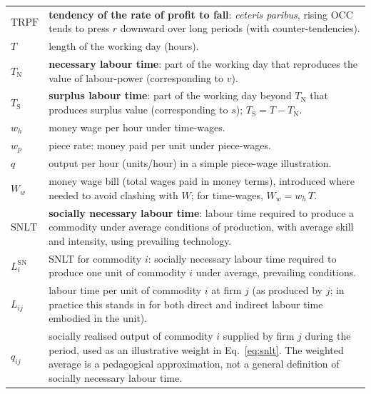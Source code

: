 \begin{longtable}{@{}>{\centering\arraybackslash}p{}@{\hspace{8pt}}%
                  >{\raggedright\arraybackslash}p{}@{}}
$\mathrm{TRPF}$ &
\textbf{tendency of the rate of profit to fall}: \emph{ceteris paribus}, rising $\mathrm{OCC}$ tends to press $r$ downward over long periods (with counter-tendencies). \\

$T$ &
length of the working day (hours). \\

$T_{\mathrm{N}}$ &
\textbf{necessary labour time}: part of the working day that reproduces the value of labour-power (corresponding to $v$). \\

$T_{\mathrm{S}}$ &
\textbf{surplus labour time}: part of the working day beyond $T_{\mathrm{N}}$ that produces surplus value (corresponding to $s$); $T_{\mathrm{S}} = T - T_{\mathrm{N}}$. \\

$w_h$ &
money wage per hour under time-wages. \\

$w_p$ &
piece rate: money paid per unit under piece-wages. \\

$q$ &
output per hour (units/hour) in a simple piece-wage illustration. \\

$W_w$ &
money wage bill (total wages paid in money terms), introduced where needed to avoid clashing with $W$; for time-wages, $W_w = w_h\,T$. \\

$\mathrm{SNLT}$ &
\textbf{socially necessary labour time}: labour time required to produce a commodity under average conditions of production, with average skill and intensity, using prevailing technology. \\

$L^{\mathrm{SN}}_i$ &
SNLT for commodity $i$: socially necessary labour time required to produce one unit of commodity $i$ under average, prevailing conditions. \\

$L_{ij}$ &
labour time per unit of commodity $i$ at firm $j$ (as produced by $j$; in practice this stands in for both direct and indirect labour time embodied in the unit). \\

$q_{ij}$ &
socially realised output of commodity \(i\) supplied by firm \(j\) during the period, used as an illustrative weight in Eq.~\eqref{eq:snlt}. The weighted average is a pedagogical approximation, not a general definition of socially necessary labour time. \\


\end{longtable}
